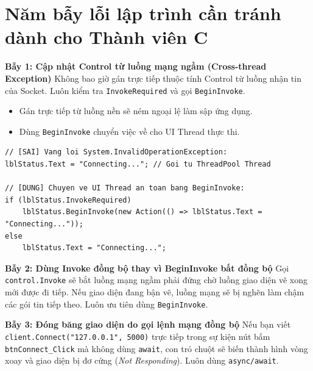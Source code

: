 \documentclass[12pt,a4paper]{article}
\begin{document}
\section{Năm bẫy lỗi lập trình cần tránh dành cho Thành viên C}

\begin{pitfallbox}
\textbf{Bẫy 1: Cập nhật Control từ luồng mạng ngầm (Cross-thread Exception)}
\newline Không bao giờ gán trực tiếp thuộc tính Control từ luồng nhận tin của Socket. Luôn kiểm tra \texttt{InvokeRequired} và gọi \texttt{BeginInvoke}.
\end{pitfallbox}

\begin{orientationbox}
\begin{itemize}[leftmargin=1.5em, itemsep=1pt]
  \item Gán trực tiếp từ luồng nền sẽ ném ngoại lệ làm sập ứng dụng.
  \item Dùng \texttt{BeginInvoke} chuyển việc về cho UI Thread thực thi.
\end{itemize}
\end{orientationbox}

\begin{lstlisting}[language=CSharp, caption={So sánh Bẫy 1: Gán trực tiếp vs BeginInvoke chuẩn}]
// [SAI] Vang loi System.InvalidOperationException:
lblStatus.Text = "Connecting..."; // Goi tu ThreadPool Thread

// [DUNG] Chuyen ve UI Thread an toan bang BeginInvoke:
if (lblStatus.InvokeRequired)
    lblStatus.BeginInvoke(new Action(() => lblStatus.Text = "Connecting..."));
else
    lblStatus.Text = "Connecting...";
\end{lstlisting}

\begin{pitfallbox}
\textbf{Bẫy 2: Dùng Invoke đồng bộ thay vì BeginInvoke bất đồng bộ}
\newline Gọi \texttt{control.Invoke} sẽ bắt luồng mạng ngầm phải đứng chờ luồng giao diện vẽ xong mới được đi tiếp. Nếu giao diện đang bận vẽ, luồng mạng sẽ bị nghẽn làm chậm các gói tin tiếp theo. Luôn ưu tiên dùng \texttt{BeginInvoke}.
\end{pitfallbox}

\begin{pitfallbox}
\textbf{Bẫy 3: Đóng băng giao diện do gọi lệnh mạng đồng bộ}
\newline Nếu bạn viết \texttt{client.Connect("127.0.0.1", 5000)} trực tiếp trong sự kiện nút bấm \texttt{btnConnect\_Click} mà không dùng \texttt{await}, con trỏ chuột sẽ biến thành hình vòng xoay và giao diện bị đơ cứng (\textit{Not Responding}). Luôn dùng \texttt{async/await}.
\end{pitfallbox}
\end{document}
